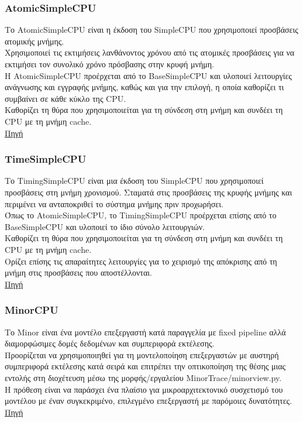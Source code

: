 \documentclass{article}
\begin{document}
\subsubsection{AtomicSimpleCPU}
Το AtomicSimpleCPU είναι η έκδοση του SimpleCPU που χρησιμοποιεί προσβάσεις ατομικής μνήμης. \\
Χρησιμοποιεί τις εκτιμήσεις λανθάνοντος χρόνου από τις ατομικές προσβάσεις για να εκτιμήσει τον συνολικό χρόνο πρόσβασης στην κρυφή μνήμη. \\
Η AtomicSimpleCPU προέρχεται από το BaseSimpleCPU και υλοποιεί λειτουργίες ανάγνωσης και εγγραφής μνήμης, καθώς και για την επιλογή, η οποία καθορίζει τι συμβαίνει σε κάθε κύκλο της CPU. \\
Καθορίζει τη θύρα που χρησιμοποιείται για τη σύνδεση στη μνήμη και συνδέει τη CPU με τη μνήμη cache.\\
\href{https://www.gem5.org/documentation/general_docs/cpu_models/SimpleCPU#atomicsimplecpu}{Πηγή}

\subsubsection{TimeSimpleCPU}
Το TimingSimpleCPU είναι μια έκδοση του SimpleCPU που χρησιμοποιεί προσβάσεις στη μνήμη χρονισμού. Σταματά στις προσβάσεις της κρυφής μνήμης και περιμένει να ανταποκριθεί το σύστημα μνήμης πριν προχωρήσει. \\
Όπως το AtomicSimpleCPU, το TimingSimpleCPU προέρχεται επίσης από το BaseSimpleCPU και υλοποιεί το ίδιο σύνολο λειτουργιών. \\
Καθορίζει τη θύρα που χρησιμοποιείται για τη σύνδεση στη μνήμη και συνδέει τη CPU με τη μνήμη cache. \\ 
Ορίζει επίσης τις απαραίτητες λειτουργίες για το χειρισμό της απόκρισης από τη μνήμη στις προσβάσεις που αποστέλλονται. \\
\href{https://www.gem5.org/documentation/general_docs/cpu_models/SimpleCPU#timingsimplecpu}{Πηγή}

\subsubsection{MinorCPU}
Το Minor είναι ένα μοντέλο επεξεργαστή κατά παραγγελία με fixed pipeline αλλά διαμορφώσιμες δομές δεδομένων και συμπεριφορά εκτέλεσης. \\
Προορίζεται να χρησιμοποιηθεί για τη μοντελοποίηση επεξεργαστών με αυστηρή συμπεριφορά εκτέλεσης κατά σειρά και επιτρέπει την οπτικοποίηση της θέσης μιας εντολής στη διοχέτευση μέσω της μορφής/εργαλείου MinorTrace/minorview.py. \\
Η πρόθεση είναι να παράσχει ένα πλαίσιο για μικροαρχιτεκτονικό συσχετισμό του μοντέλου με έναν συγκεκριμένο, επιλεγμένο επεξεργαστή με παρόμοιες δυνατότητες.\\
\href{https://www.gem5.org/documentation/general_docs/cpu_models/minor_cpu}{Πηγή}
\end{document}
